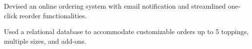\documentclass[a4paper,20pt]{article}
\makeatletter
\newcommand{\resumeSmallSubheading}[2]{
  \vspace{-1pt}\item
    \begin{tabular*}{0.97\textwidth}{l@{\extracolsep{\fill}}r}
      #1 & #2 \\
    \end{tabular*}\vspace{-5pt}
}
\makeatother
\begin{document}
    \begin{description}[font=$\bullet$]
        \item {Devised an online ordering system with email notification and streamlined one-click reorder functionalities.}
    \vspace{-2pt}
        \item {Used a relational database to accommodate customizable orders up to 5 toppings, multiple sizes, and add-ons.}
    \vspace{-2pt}
    \end{description}

    


    
    
    
\end{document}
